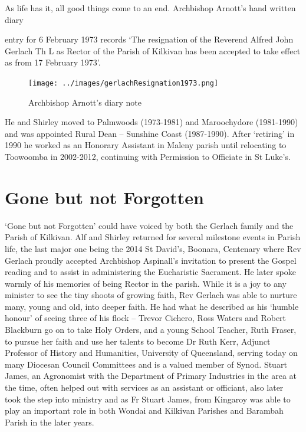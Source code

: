 As life has it, all good things come to an end. Archbishop Arnott's hand written diary



entry for 6 February 1973 records `The resignation of the Reverend Alfred John Gerlach Th L as Rector of the Parish of Kilkivan has been accepted to take effect as from 17 February 1973'.









\begin{figure}[!htb]
\begin{center}
\texttt{[image: ../images/gerlachResignation1973.png]}
\caption{Archbishop Arnott's diary note}
\end{center}
\end{figure}




He and Shirley moved to Palmwoods (1973-1981) and Maroochydore (1981-1990) and was appointed Rural Dean -- Sunshine Coast (1987-1990). After `retiring' in 1990 he worked as an Honorary Assistant in Maleny parish until relocating to Toowoomba in 2002-2012, continuing with Permission to Officiate in St Luke's.



\section{Gone but not Forgotten}



`Gone but not Forgotten' could have voiced by both the Gerlach family and the Parish of Kilkivan. Alf and Shirley returned for several milestone events in Parish life, the last major one being the 2014 St David's, Boonara, Centenary where Rev Gerlach proudly accepted Archbishop Aspinall's invitation to present the Gospel reading and to assist in administering the Eucharistic Sacrament. He later spoke warmly of his memories of being Rector in the parish. While it is a joy to any minister to see the tiny shoots of growing faith, Rev Gerlach was able to nurture many, young and old, into deeper faith. He had what he described as his `humble honour' of seeing three of his flock -- Trevor Cichero, Ross Waters and Robert Blackburn go on to take Holy Orders, and a young School Teacher, Ruth Fraser, to pursue her faith and use her talents to become Dr Ruth Kerr, Adjunct Professor of History and Humanities, University of Queensland, serving today on many Diocesan Council Committees and is a valued member of Synod. Stuart James, an Agronomist with the Department of Primary Industries in the area at the time, often helped out with services as an assistant or officiant, also later took the step into ministry and as Fr Stuart James, from Kingaroy was able to play an important role in both Wondai and Kilkivan Parishes and Barambah Parish in the later years.



